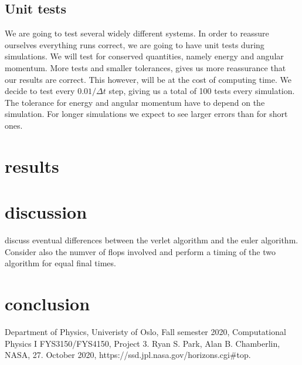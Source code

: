 \documentclass[reprint, english,notitlepage,nofootinbib]{revtex4-1}  %
\begin{document}
\subsection{Unit tests}
We are going to test several widely different systems. In order to reassure ourselves everything runs correct, we are going to have unit tests during simulations. We will test for conserved quantities, namely energy and angular momentum. More tests and smaller tolerances, gives us more reassurance that our results are correct. This however, will be at the cost of computing time. We decide to test every $0.01/\Delta t$ step, giving us a total of 100 tests every simulation. The tolerance for energy and angular momentum have to depend on the simulation. For longer simulations we expect to see larger errors than for short ones.

\section{results}

\section{discussion}

discuss eventual differences between the verlet algorithm and the euler algorithm. Consider also the numver of flops involved and perform a timing of the two algorithm for equal final times.

\section{conclusion}




\onecolumngrid
\vspace{1cm} %
\newpage

\begin{thebibliography}{}
 Department of Physics, Univeristy of Oslo, Fall semester 2020, Computational Physics I FYS3150/FYS4150, Project 3.
 Ryan S. Park, Alan B. Chamberlin, NASA, 27. October 2020, https://ssd.jpl.nasa.gov/horizons.cgi\#top.

\end{thebibliography}
\end{document}
